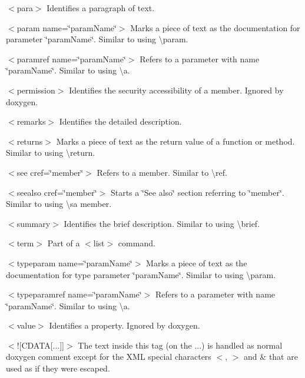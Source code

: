 \begin{DoxyItemize}
\item {\ttfamily $<$para$>$} Identifies a paragraph of text. 
\item {\ttfamily $<$param name=\char`\"{}param\+Name\char`\"{}$>$} Marks a piece of text as the documentation for parameter \char`\"{}param\+Name\char`\"{}. Similar to using \textbackslash{}param. 
\item {\ttfamily $<$paramref name=\char`\"{}param\+Name\char`\"{}$>$} Refers to a parameter with name \char`\"{}param\+Name\char`\"{}. Similar to using \textbackslash{}a. 
\item {\ttfamily $<$permission$>$} Identifies the security accessibility of a member. Ignored by doxygen. 
\item {\ttfamily $<$remarks$>$} Identifies the detailed description. 
\item {\ttfamily $<$returns$>$} Marks a piece of text as the return value of a function or method. Similar to using \textbackslash{}return. 
\item {\ttfamily $<$see cref=\char`\"{}member\char`\"{}$>$} Refers to a member. Similar to \textbackslash{}ref. 
\item {\ttfamily $<$seealso cref=\char`\"{}member\char`\"{}$>$} Starts a \char`\"{}\+See also\char`\"{} section referring to \char`\"{}member\char`\"{}. Similar to using \textbackslash{}sa member. 
\item {\ttfamily $<$summary$>$} Identifies the brief description. Similar to using \textbackslash{}brief. 
\item {\ttfamily $<$term$>$} Part of a {\ttfamily $<$list$>$} command. 
\item {\ttfamily $<$typeparam name=\char`\"{}param\+Name\char`\"{}$>$} Marks a piece of text as the documentation for type parameter \char`\"{}param\+Name\char`\"{}. Similar to using \textbackslash{}param. 
\item {\ttfamily $<$typeparamref name=\char`\"{}param\+Name\char`\"{}$>$} Refers to a parameter with name \char`\"{}param\+Name\char`\"{}. Similar to using \textbackslash{}a. 
\item {\ttfamily $<$value$>$} Identifies a property. Ignored by doxygen. 
\item {\ttfamily $<$!\mbox{[}C\+D\+A\+TA\mbox{[}...\mbox{]}\mbox{]}$>$} The text inside this tag (on the ...) is handled as normal doxygen comment except for the X\+ML special characters {\ttfamily $<$}, {\ttfamily $>$} and {\ttfamily \&} that are used as if they were escaped. 
\end{DoxyItemize}

